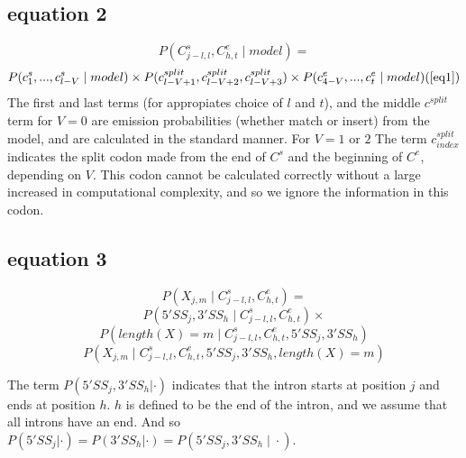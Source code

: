 \subsection{equation 2}
$$
P(C^s_{j-l,l},C^e_{h,t}\; |\;  model) =
$$
$$
P(c^s_1,...,c^s_{l-V}\; |\;
model) \times P(c^{split}_{l-V+1},c^{split}_{l-V+2},c^{split}_{l-V+3}) \times
P(c^e_{4-V},...,c^e_{t} \; |\;  model) (\ref{eq1})
$$
The first and last terms (for appropiates choice of $l$ and $t$), and the
middle $c^{split}$ term for $V = 0$ are
emission probabilities (whether match or insert) from the model, and are
calculated in the standard manner. For $V = 1 \mbox{ or } 2$ 
The term $c^{split}_{index}$ indicates the
split codon made from the end of $C^s$ and the beginning of $C^e$,
depending on $V$. This codon cannot be calculated correctly without a
large increased in computational complexity, and so we ignore the 
information in this codon.

\subsection{equation 3}
$$
P(X_{j,m}\; |\; C^s_{j-l,l},C^e_{h,t}) = 
$$
\begin{equation}\label{eq2.1}
P(5'SS_j,3'SS_h \; |\;  C^s_{j-l,l},C^e_{h,t})\times
\end{equation}
\begin{equation}\label{eq2.2}
P(length(X)=m \; |\; C^s_{j-l,l},C^e_{h,t},5'SS_j,3'SS_h)
\end{equation}
\begin{equation}\label{eq2.3}
P(X_{j,m} \; |\; C^s_{j-l,l},C^e_{h,t},5'SS_j,3'SS_h,length(X)=m)
\end{equation}

The term $P(5'SS_j,3'SS_h | \cdot)$ indicates that the intron starts
at position $j$ and ends at position $h$. $h$ is defined to
be the end of the intron, and we assume that all introns have an end.
And so $P(5'SS_j| \cdot) = P(3'SS_h| \cdot) = P(5'SS_j,3'SS_h\; |\;\cdot)$.

